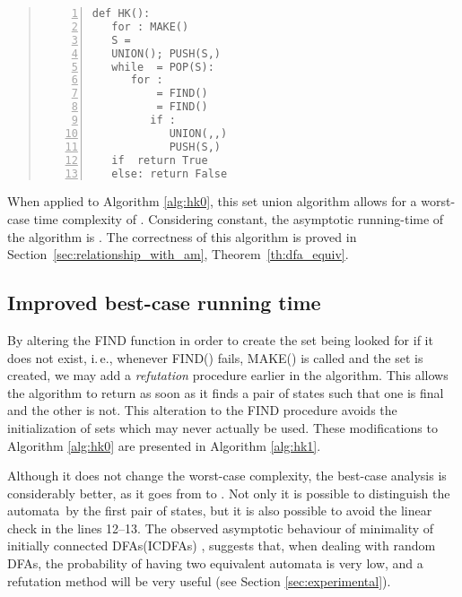 \documentclass[copyright]{eptcs}
\newcommand{\dfas}{DFAs\xspace}
\newcommand{\icdfa}{ICDFA\xspace}
\newcommand{\ie}{i.\,e.}
\newcommand{\hk}{\textbf{HK}\xspace}
\begin{document}
\begin{quote}\begin{lstlisting}[caption={The original \hk{} algorithm.},
captionpos=b,numbers=left,label=alg:hk0]
def HK():
   for : MAKE()
   S = 
   UNION(); PUSH(S,)
   while  = POP(S):
      for :
          = FIND()
          = FIND()
         if :
            UNION(,,)
            PUSH(S,)
   if  return True
   else: return False
\end{lstlisting}
\end{quote}

 When
applied to Algorithm \ref{alg:hk0}, this set union algorithm allows
for a worst-case time complexity of . Considering 
constant, the asymptotic running-time of the algorithm is
. The correctness of this algorithm is proved in
Section~\ref{sec:relationship_with_am}, Theorem~\ref{th:dfa_equiv}.

\subsection{Improved best-case running time}
\label{subsec:refutation}

By altering the FIND function in order to create the set being looked
for if it does not exist, \ie, whenever FIND() fails, MAKE() is
called and the set  is created, we may add a
\emph{refutation} procedure earlier in the algorithm. This allows the
algorithm to return as soon as it finds a pair of states such that one
is final and the other is
not.
This alteration to the FIND procedure avoids the initialization of
 sets which may never actually be used. These modifications to
Algorithm \ref{alg:hk0} are presented in Algorithm \ref{alg:hk1}.

Although it does not change the worst-case complexity, the best-case
analysis is considerably better, as it goes from  to
. Not only it is possible to distinguish the automata~by
the first pair of states, but it is also possible to avoid the linear
check in the lines 12--13.
The observed asymptotic behaviour of minimality of initially connected
\dfas (\icdfa{}s) \cite{almeida07_c:_enumer_gener_strin_autom_repres},
suggests that, when dealing with random \dfas, the probability of
having two equivalent automata is very low, and a refutation method
will be very useful (see Section \ref{sec:experimental}).
\end{document}
